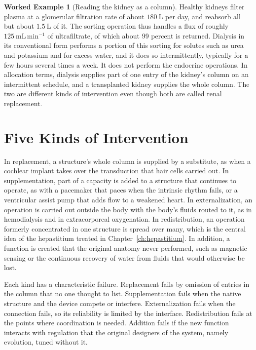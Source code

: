 \documentclass[11pt,openany]{book}
\theoremstyle{definition}
\newtheorem{example}{Worked Example}[chapter]
\theoremstyle{remark}
\begin{document}
\begin{example}[Reading the kidney as a column]
\label{ex:kidney}
Healthy kidneys filter plasma at a glomerular filtration rate of about $180\ \mathrm{L}$ per day, and reabsorb all but about $1.5\ \mathrm{L}$ of it. The sorting operation thus handles a flux of roughly $125\ \mathrm{mL\,min^{-1}}$ of ultrafiltrate, of which about 99 percent is returned. Dialysis in its conventional form performs a portion of this sorting for solutes such as urea and potassium and for excess water, and it does so intermittently, typically for a few hours several times a week. It does not perform the endocrine operations. In allocation terms, dialysis supplies part of one entry of the kidney's column on an intermittent schedule, and a transplanted kidney supplies the whole column. The two are different kinds of intervention even though both are called renal replacement.
\end{example}

\section{Five Kinds of Intervention}

In replacement, a structure's whole column is supplied by a substitute, as when a cochlear implant takes over the transduction that hair cells carried out. In supplementation, part of a capacity is added to a structure that continues to operate, as with a pacemaker that paces when the intrinsic rhythm fails, or a ventricular assist pump that adds flow to a weakened heart. In externalization, an operation is carried out outside the body with the body's fluids routed to it, as in hemodialysis and in extracorporeal oxygenation. In redistribution, an operation formerly concentrated in one structure is spread over many, which is the central idea of the hepastitium treated in Chapter~\ref{ch:hepastitium}. In addition, a function is created that the original anatomy never performed, such as magnetic sensing or the continuous recovery of water from fluids that would otherwise be lost.

Each kind has a characteristic failure. Replacement fails by omission of entries in the column that no one thought to list. Supplementation fails when the native structure and the device compete or interfere. Externalization fails when the connection fails, so its reliability is limited by the interface. Redistribution fails at the points where coordination is needed. Addition fails if the new function interacts with regulation that the original designers of the system, namely evolution, tuned without it.
\end{document}
